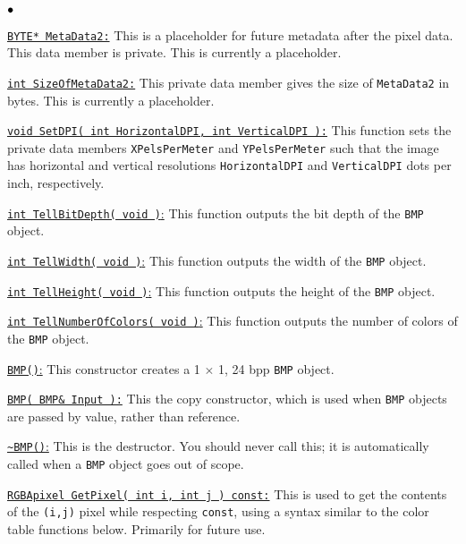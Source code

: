 \documentclass[12pt]{article}
\begin{document}
\begin{list}{$\bullet\hspace{.125in}$}{}
\item 
\underline{\texttt{BYTE* MetaData2:}}
This is a placeholder for future metadata after the 
pixel data. This data member is private. This is currently a 
placeholder.

\item 
\underline{\texttt{int SizeOfMetaData2:}} This 
private data member gives the size of 
\texttt{MetaData2} in bytes. This is currently a 
placeholder.

\item 
\underline{\texttt{void SetDPI( int HorizontalDPI, int VerticalDPI ):}} This function sets the 
private data members \texttt{XPelsPerMeter} 
and \texttt{YPelsPerMeter} such that the image 
has horizontal and vertical resolutions 
\texttt{HorizontalDPI} and 
\texttt{VerticalDPI} dots per inch, respectively.


\item 
\underline{\texttt{int TellBitDepth( void )}:} This 
function outputs the bit depth of the \texttt{BMP} object. 

\item 
\underline{\texttt{int TellWidth( void )}:} This 
function outputs the width of the \texttt{BMP} object. 

\item 
\underline{\texttt{int TellHeight( void )}:} This 
function outputs the height of the \texttt{BMP} object. 

\item 
\underline{\texttt{int TellNumberOfColors( void )}:} This 
function outputs the number of colors of the \texttt{BMP} object. 

\item 
\underline{\texttt{BMP()}:} This constructor creates a 
1 $\times$ 1, 24 bpp \texttt{BMP} object. 

\item 
\underline{\texttt{BMP( BMP\& Input ):}} This the copy constructor, 
which is used when \texttt{BMP} objects are passed by value, 
rather than reference.

\item 
\underline{\texttt{\~{}BMP()}:} This is the destructor. You should 
never call this; it is automatically called when a \texttt{BMP} object 
goes out of scope. 

\item
\underline{\texttt{RGBApixel GetPixel( int i, int j ) const:}} This 
is used to get the contents of the \texttt{(i,j)} pixel while 
respecting \texttt{const}, using a syntax similar to the 
color table functions below. Primarily for future use. 


\end{list}
\end{document}
